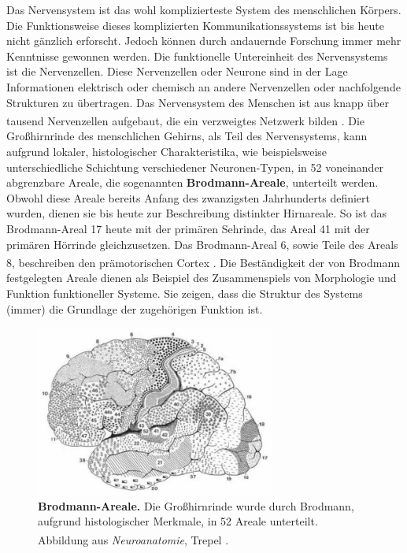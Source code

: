 \documentclass[12pt,a4paper,pdftex]{article}
\begin{document}
 Das Nervensystem ist das wohl komplizierteste System des menschlichen Körpers. Die Funktionsweise dieses komplizierten Kommunikationssystems ist bis heute nicht gänzlich erforscht. Jedoch können durch andauernde Forschung immer mehr Kenntnisse gewonnen werden. Die funktionelle Untereinheit des Nervensystems ist die Nervenzellen. Diese Nervenzellen oder Neurone sind in der Lage Informationen elektrisch oder chemisch an andere Nervenzellen oder nachfolgende Strukturen zu übertragen. Das Nervensystem des Menschen ist aus knapp über tausend Nervenzellen aufgebaut, die ein verzweigtes Netzwerk bilden \textsuperscript{\cite[1]{trepel2011neuroanatomie}}. Die Großhirnrinde des menschlichen Gehirns, als Teil des Nervensystems, kann aufgrund lokaler, histologischer Charakteristika, wie beispielsweise unterschiedliche Schichtung verschiedener Neuronen-Typen, in 52 voneinander abgrenzbare Areale, die sogenannten \textbf{Brodmann-Areale}, unterteilt werden. Obwohl diese Areale bereits Anfang des zwanzigsten Jahrhunderts definiert wurden, dienen sie bis heute zur Beschreibung distinkter Hirnareale. So ist das Brodmann-Areal 17 heute mit der primären Sehrinde, das Areal 41 mit der primären Hörrinde gleichzusetzen. Das Brodmann-Areal 6, sowie Teile des Areals 8, beschreiben den prämotorischen Cortex \textsuperscript{\cite[9]{trepel2011neuroanatomie}}. Die Beständigkeit der von Brodmann festgelegten Areale dienen als Beispiel des Zusammenspiels von Morphologie und Funktion funktioneller Systeme. Sie zeigen, dass die Struktur des Systems (immer) die Grundlage der zugehörigen Funktion ist.

\begin{figure}[H]
    \centering
    \includegraphics[width=0.7\textwidth]{pictures/Bilder_Jule/Andere/brodmann.PNG}
    \caption[Brodmann-Areale]{\textbf{Brodmann-Areale.} Die Großhirnrinde wurde durch Brodmann, aufgrund histologischer Merkmale, in 52 Areale unterteilt. \\
    Abbildung aus \textit{Neuroanatomie}, Trepel \textsuperscript{\cite[9]{trepel2011neuroanatomie}}.}
    \label{fig:brodmann_areale}
\end{figure}{}
\end{document}
